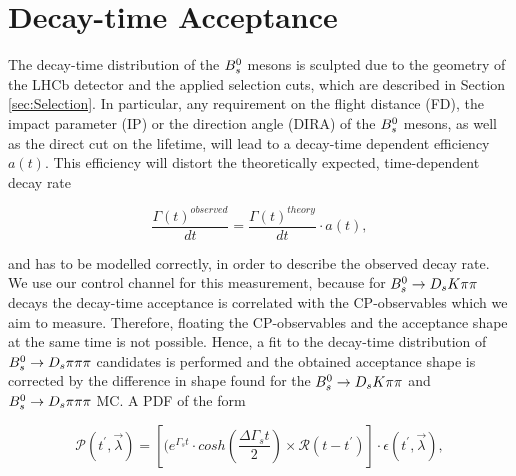 \section{Decay-time Acceptance}
\label{sec:Acceptance}
The decay-time distribution of the ${{B}^0_{s}}$ mesons is sculpted due to the geometry of the LHCb detector and the applied selection cuts, which are described in Section \ref{sec:Selection}.
In particular, any requirement on the flight distance (FD), the impact parameter (IP) or the direction angle (DIRA) of the ${{B}^0_{s}}$ mesons, as well as the direct cut on the lifetime, will lead to a decay-time dependent efficiency $a(t)$. This efficiency will distort the theoretically expected, time-dependent decay rate

\begin{equation}
\frac{\Gamma(t)^{observed}}{dt} = \frac{\Gamma(t)^{theory}}{dt} \cdot a(t),
\label{eq:DecRateAcc}
\end{equation} 

and has to be modelled correctly, in order to describe the observed decay rate. We use our control channel for this measurement, because for ${{B}^0_{s}}\rightarrow{\ensuremath{{D}_{s}}}{\ensuremath{K}}{\ensuremath{\pi}}{\ensuremath{\pi}}$ decays the decay-time acceptance is correlated with the CP-observables which we aim to measure. Therefore, floating the CP-observables and the acceptance shape at the same time is not possible. 
Hence, a fit to the decay-time distribution of ${{B}^0_{s}}\rightarrow{\ensuremath{{D}_{s}}}{\ensuremath{\pi}}{\ensuremath{\pi}}{\ensuremath{\pi}}$ candidates is performed and the obtained acceptance shape is corrected by the difference in shape found for the ${{B}^0_{s}}\rightarrow{\ensuremath{{D}_{s}}}{\ensuremath{K}}{\ensuremath{\pi}}{\ensuremath{\pi}}$ and ${{B}^0_{s}}\rightarrow{\ensuremath{{D}_{s}}}{\ensuremath{\pi}}{\ensuremath{\pi}}{\ensuremath{\pi}}$ MC. \newline
A PDF of the form

\begin{equation}
\mathcal{P}(t^{'},\vec{\lambda}) = \left[ (e^{\Gamma_{s}t}\cdot cosh(\frac{\Delta\Gamma_{s}t}{2}) \times \mathcal{R}(t - t^{'})\right] \cdot \epsilon(t^{'}, \vec{\lambda}),
\label{eq:AccPDF}
\end{equation}

